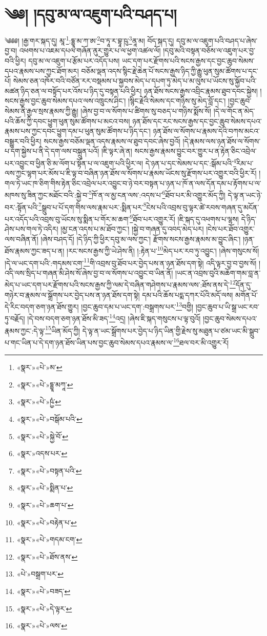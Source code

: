 \chapter{༄༅། །དབུ་མ་ལ་འཇུག་པའི་བཤད་པ།}༄༅༅། །རྒྱ་གར་སྐད་དུ། མཱ་\footnote{«སྣར་»«པེ་»མ་}:དྷྱཱ་མ་ཀ་ཨ་\footnote{«སྣར་»«པེ་»དྷྱཱ་མཀཱ་}བ་ཏཱ་ར་བྷཱ་ཥུ་\footnote{«སྣར་»«པེ་»ཥྱཾ་}ནཱ་མ། བོད་སྐད་དུ། དབུ་མ་ལ་འཇུག་པའི་བཤད་པ་ཞེས་བྱ་བ། འཕགས་པ་འཇམ་དཔལ་གཞོན་ནུར་གྱུར་པ་ལ་ཕྱག་འཚལ་ལོ། །དབུ་མའི་བསྟན་བཅོས་ལ་འཇུག་པར་བྱ་བའི་ཕྱིར། དབུ་མ་ལ་འཇུག་པ་རྩོམ་པར་འདོད་པས། ཡང་དག་པར་རྫོགས་པའི་སངས་རྒྱས་དང་བྱང་ཆུབ་སེམས་དཔའ་རྣམས་པས་ཀྱང་ཐོག་མར། བཅོམ་ལྡན་འདས་སྙིང་རྗེ་ཆེན་པོ་སངས་རྒྱས་ཉིད་ཀྱི་རྒྱུ་ཕུན་སུམ་ཚོགས་པ་དང་པོ། སེམས་ཅན་འཁོར་བའི་བཙོན་རར་བསྡམས་པ་སྐྱབས་མེད་པ་དཔག་ཏུ་མེད་པ་མ་ལུས་པ་ཡོངས་སུ་སྐྱོབ་པའི་མཚན་ཉིད་ཅན་ལ་བསྟོད་པར་འོས་པ་ཉིད་དུ་བསྟན་པའི་ཕྱིར། ཉན་ཐོས་སངས་རྒྱས་འབྲིང་རྣམས་ཐུབ་དབང་སྐྱེས། །སངས་རྒྱས་བྱང་ཆུབ་སེམས་དཔའ་ལས་འཁྲུངས་ཤིང་། །སྙིང་རྗེའི་སེམས་དང་གཉིས་སུ་མེད་བློ་དང་། །བྱང་ཆུབ་སེམས་ནི་རྒྱལ་སྲས་རྣམས་ཀྱི་རྒྱུ། །ཞེས་བྱ་བ་ལ་སོགས་པ་ཚིགས་སུ་བཅད་པ་གཉིས་སྨོས་སོ། །དེ་ལ་གོང་ན་མེད་པའི་ཆོས་ཀྱི་དབང་ཕྱུག་ཕུན་སུམ་ཚོགས་པ་མངའ་བས། ཉན་ཐོས་དང་རང་སངས་རྒྱས་དང་བྱང་ཆུབ་སེམས་དཔའ་རྣམས་པས་ཀྱང་དབང་ཕྱུག་དམ་པ་ཕུན་སུམ་ཚོགས་པ་ཉིད་དང་། ཉན་ཐོས་ལ་སོགས་པ་རྣམས་དེའི་བཀས་མངའ་བསྒྱུར་བའི་ཕྱིར། སངས་རྒྱས་བཅོམ་ལྡན་འདས་རྣམས་ལ་ཐུབ་དབང་ཞེས་བྱའོ། །དེ་རྣམས་ལས་ཉན་ཐོས་ལ་སོགས་པ་དག་སྐྱེས་པ་ནི་དེ་དག་ལས་བསྐྲུན་པའོ། །ཇི་ལྟར་ཞེ་ན། སངས་རྒྱས་རྣམས་བྱུང་བར་གྱུར་པ་ན་རྟེན་ཅིང་འབྲེལ་པར་འབྱུང་བ་ཕྱིན་ཅི་མ་ལོག་པ་སྟོན་པ་ལ་འཇུག་པའི་ཕྱིར་ལ། དེ་ཉན་པ་དང་སེམས་པ་དང་:སྒོམ་པའི་\footnote{«སྣར་»«པེ་»བསྒོམ་པའི་}རིམ་པ་ལས་ཀྱང་ལྷག་པར་མོས་པ་ཇི་ལྟ་བ་བཞིན་ཉན་ཐོས་ལ་སོགས་པ་རྣམས་ཡོངས་སུ་རྫོགས་པར་འགྱུར་བའི་ཕྱིར་རོ། །གལ་ཏེ་ཡང་ཁ་ཅིག་གིས་རྟེན་ཅིང་འབྲེལ་པར་འབྱུང་བ་ཉེ་བར་བསྟན་པ་ཉན་པ་ཁོ་ན་ལས་དོན་དམ་པ་རྟོགས་པ་ལ་མཁས་སུ་ཟིན་ཀྱང་མཐོང་བའི་:སྐྱེ་བ་\footnote{«སྣར་»«པེ་»སྐྱེ་བོ་}ཁོ་ན་ལ་མྱ་ངན་ལས་:འདས་པ་\footnote{«སྣར་»འདས་པར་}ཐོབ་པར་མི་འགྱུར་མོད་ཀྱི། དེ་ལྟ་ན་ཡང་ཉེ་བར་:སྟོན་པའི་\footnote{«སྣར་»«པེ་»བསྟན་པའི་}སྒྲུབ་པ་པོ་དག་གིས་ལས་རྣམ་པར་:སྨིན་པར་\footnote{«སྣར་»«པེ་»སྨིན་པ་}ངེས་པའི་འབྲས་བུ་ལྟར་ཚེ་རབས་གཞན་དུ་མངོན་པར་འདོད་པའི་འབྲས་བུ་ཡོངས་སུ་སྨིན་པ་གོར་མ་ཆག་\footnote{«སྣར་»«པེ་»ཆག་པ་}ཐོབ་པར་འགྱུར་རོ། །ཇི་སྐད་དུ་འཕགས་པ་ལྷས། དེ་ཉིད་ཤེས་པས་གལ་ཏེ་འདིར། །མྱ་ངན་འདས་པ་མ་ཐོབ་ཀྱང་། །སྐྱེ་བ་གཞན་དུ་འབད་མེད་པར། །ངེས་པར་ཐོབ་འགྱུར་ལས་བཞིན་ནོ། །ཞེས་བཤད་དོ། །དེ་ཉིད་ཀྱི་ཕྱིར་དབུ་མ་ལས་ཀྱང་། རྫོགས་སངས་རྒྱས་རྣམས་མ་བྱུང་ཞིང་། །ཉན་ཐོས་རྣམས་ཀྱང་ཟད་པ་ན། །རང་སངས་རྒྱས་ཀྱི་ཡེ་ཤེས་ནི། །:རྟེན་པ་\footnote{«སྣར་»«པེ་»བརྟེན་པ་}མེད་པར་རབ་ཏུ་འབྱུང་། །ཞེས་གསུངས་སོ། །དེ་ལ་ཡང་དག་པའི་:གདམས་ངག་\footnote{«སྣར་»«པེ་»གདམ་ངག་}གི་འབྲས་བུ་ཐོབ་པར་བྱེད་པས་ན་ཉན་ཐོས་དག་སྟེ། འདི་ལྟར་བྱ་བ་བྱས་སོ། །འདི་ལས་སྲིད་པ་གཞན་མི་ཤེས་སོ་ཞེས་བྱ་བ་ལ་སོགས་པ་འབྱུང་བ་ཡིན་ནོ། །ཡང་ན་འབྲས་བུའི་མཆོག་གམ་བླ་ན་མེད་པ་ཡང་དག་པར་རྫོགས་པའི་སངས་རྒྱས་ཀྱི་ལམ་དེ་བཞིན་གཤེགས་པ་རྣམས་ལས་:ཐོས་ནས་དེ་\footnote{«སྣར་»«པེ་»ཐོས་ནས་}དོན་དུ་གཉེར་བ་རྣམས་ལ་སྒྲོགས་པར་བྱེད་པས་ན་ཉན་ཐོས་དག་སྟེ། དམ་པའི་ཆོས་པདྨ་དཀར་པོའི་མདོ་ལས། མགོན་པོ་དེ་རིང་བདག་ཅག་ཉན་ཐོས་གྱུར། །བྱང་ཆུབ་དམ་པ་ཡང་དག་:བསྒྲགས་པར་\footnote{«པེ་»བསྒྲག་པར་}བགྱི། །བྱང་ཆུབ་པ་ཡི་སྒྲ་ཡང་རབ་ཏུ་བརྗོད། །དེ་བས་བདག་ཅག་ཉན་ཐོས་མི་ཟད་\footnote{«སྣར་»«པེ་»བཟད་}འདྲ། །ཞེས་ཇི་སྐད་གསུངས་པ་ལྟ་བུའོ། །བྱང་ཆུབ་སེམས་དཔའ་རྣམས་ཀྱང་:དེ་ལྟ་\footnote{«སྣར་»«པེ་»དེ་ལྟར་}ཡིན་མོད་ཀྱི། དེ་ལྟ་ན་ཡང་སྒྲོགས་པར་བྱེད་པ་ཉིད་ཡིན་གྱི་རྗེས་སུ་མཐུན་པ་ཙམ་ཡང་མི་སྒྲུབ་པ་གང་ཡིན་པ་དེ་དག་ཉན་ཐོས་ཡིན་པས་བྱང་ཆུབ་སེམས་དཔའ་རྣམས་ལ་\footnote{«སྣར་»«པེ་»ལས་}ཐལ་བར་མི་འགྱུར་རོ། 